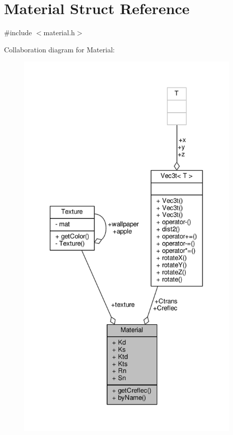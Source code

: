\hypertarget{structMaterial}{}\section{Material Struct Reference}
\label{structMaterial}


{\ttfamily \#include $<$material.\+h$>$}



Collaboration diagram for Material\+:
\nopagebreak
\begin{figure}[H]
\begin{center}
\leavevmode
\includegraphics[height=550pt]{structMaterial__coll__graph}
\end{center}
\end{figure}
